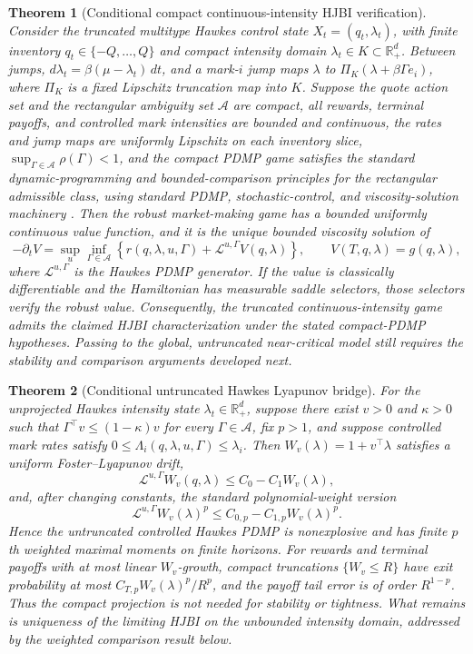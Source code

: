 \documentclass[11pt]{article}
\newtheorem{theorem}{Theorem}
\newcommand{\R}{\mathbb{R}}
\begin{document}
\begin{theorem}[Conditional compact continuous-intensity HJBI verification]
Consider the truncated multitype Hawkes control state
$X_t=(q_t,\lambda_t)$, with finite inventory
$q_t\in\{-Q,\ldots,Q\}$ and compact intensity domain
$\lambda_t\in K\subset\R_+^d$. Between jumps,
$d\lambda_t=\beta(\mu-\lambda_t)\,dt$, and a mark-$i$ jump maps
$\lambda$ to $\Pi_K(\lambda+\beta\Gamma e_i)$, where $\Pi_K$ is a fixed
Lipschitz truncation map into $K$. Suppose the quote action set
and the rectangular ambiguity set $\mathcal A$ are compact, all rewards,
terminal payoffs, and controlled mark intensities are bounded and continuous,
the rates and jump maps are uniformly Lipschitz on each inventory slice,
$\sup_{\Gamma\in\mathcal A}\rho(\Gamma)<1$, and the compact PDMP game satisfies
the standard dynamic-programming and bounded-comparison principles for the
rectangular admissible class, using standard PDMP, stochastic-control, and
viscosity-solution machinery
\cite{Davis1993,FlemingSoner2006,CrandallIshiiLions1992}. Then the robust market-making game has a bounded
uniformly continuous value function, and it is the unique bounded viscosity
solution of
\[
-\partial_t V=
\sup_{u}\inf_{\Gamma\in\mathcal A}
\left\{
r(q,\lambda,u,\Gamma)+\mathcal L^{u,\Gamma}V(q,\lambda)
\right\},\qquad
V(T,q,\lambda)=g(q,\lambda),
\]
where $\mathcal L^{u,\Gamma}$ is the Hawkes PDMP generator. If the value is
classically differentiable and the Hamiltonian has measurable saddle
selectors, those selectors verify the robust value. Consequently, the truncated
continuous-intensity game admits the claimed HJBI characterization under the
stated compact-PDMP hypotheses. Passing to the global, untruncated
near-critical model still requires the stability and comparison arguments
developed next.
\end{theorem}

\begin{theorem}[Conditional untruncated Hawkes Lyapunov bridge]
For the unprojected Hawkes intensity state $\lambda_t\in\R_+^d$, suppose there
exist $v>0$ and $\kappa>0$ such that
$\Gamma^\top v\le(1-\kappa)v$ for every
$\Gamma\in\mathcal A$, fix $p>1$, and suppose controlled mark rates satisfy
$0\le\Lambda_i(q,\lambda,u,\Gamma)\le \lambda_i$. Then
$W_v(\lambda)=1+v^\top\lambda$ satisfies a uniform Foster--Lyapunov drift,
\[
\mathcal L^{u,\Gamma}W_v(q,\lambda)
\le C_0-C_1W_v(\lambda),
\]
and, after changing constants, the standard polynomial-weight version
\[
\mathcal L^{u,\Gamma}W_v(\lambda)^p
\le C_{0,p}-C_{1,p}W_v(\lambda)^p.
\]
Hence the untruncated controlled Hawkes PDMP is nonexplosive and has finite
$p$th weighted maximal moments on finite horizons. For rewards and terminal
payoffs with at most linear $W_v$-growth, compact truncations $\{W_v\le R\}$
have exit probability at most $C_{T,p}W_v(\lambda)^p/R^p$, and the payoff
tail error is of order $R^{1-p}$. Thus the compact projection is not needed for
stability or tightness. What remains is uniqueness of the limiting HJBI on the
unbounded intensity domain, addressed by the weighted comparison result below.
\end{theorem}
\end{document}
